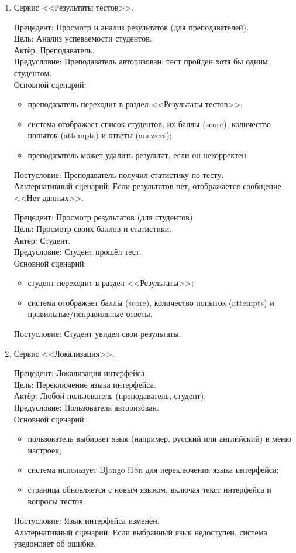 \begin{enumerate}
	\item {Сервис <<Результаты тестов>>}.
	
	{Прецедент: Просмотр и анализ результатов (для преподавателей)}. \\
	{Цель}: Анализ успеваемости студентов. \\
	{Актёр}: Преподаватель. \\
	{Предусловие}: Преподаватель авторизован, тест пройден хотя бы одним студентом. \\
	{Основной сценарий}:
	\begin{itemize}
		\item преподаватель переходит в раздел <<Результаты тестов>>;
		\item система отображает список студентов, их баллы (score), количество попыток (attempts) и ответы (answers);
		\item преподаватель может удалить результат, если он некорректен.
	\end{itemize}
	{Постусловие}: Преподаватель получил статистику по тесту. \\
	{Альтернативный сценарий}: Если результатов нет, отображается сообщение <<Нет данных>>.
	
	{Прецедент: Просмотр результатов (для студентов)}. \\
	{Цель}: Просмотр своих баллов и статистики. \\
	{Актёр}: Студент. \\
	{Предусловие}: Студент прошёл тест. \\
	{Основной сценарий}:
	\begin{itemize}
		\item студент переходит в раздел <<Результаты>>;
		\item система отображает баллы (score), количество попыток (attempts) и правильные/неправильные ответы.
	\end{itemize}
	{Постусловие}: Студент увидел свои результаты.
	
	\item {Сервис <<Локализация>>}.
	
	{Прецедент: Локализация интерфейса}. \\
	{Цель}: Переключение языка интерфейса. \\
	{Актёр}: Любой пользователь (преподаватель, студент). \\
	{Предусловие}: Пользователь авторизован. \\
	{Основной сценарий}:
	\begin{itemize}
		\item пользователь выбирает язык (например, русский или английский) в меню настроек;
		\item система использует Django i18n для переключения языка интерфейса;
		\item страница обновляется с новым языком, включая текст интерфейса и вопросы тестов.
	\end{itemize}
	{Постусловие}: Язык интерфейса изменён. \\
	{Альтернативный сценарий}: Если выбранный язык недоступен, система уведомляет об ошибке.
	

\end{enumerate}
